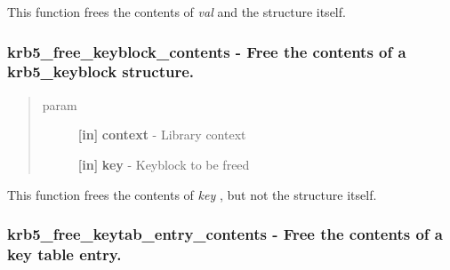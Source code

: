 \documentclass[letterpaper,10pt,english]{sphinxmanual}
\begin{document}
This function frees the contents of \emph{val} and the structure itself.


\subsubsection{krb5\_free\_keyblock\_contents -  Free the contents of a krb5\_keyblock structure.}
\label{appdev/refs/api/krb5_free_keyblock_contents::doc}\label{appdev/refs/api/krb5_free_keyblock_contents:krb5-free-keyblock-contents-free-the-contents-of-a-krb5-keyblock-structure}

\begin{fulllineitems}
\label{appdev/refs/api/krb5_free_keyblock_contents:krb5_free_keyblock_contents}
\end{fulllineitems}

\begin{quote}\begin{description}
\item[{param}] \leavevmode
\textbf{{[}in{]}} \textbf{context} - Library context

\textbf{{[}in{]}} \textbf{key} - Keyblock to be freed

\end{description}\end{quote}

This function frees the contents of \emph{key} , but not the structure itself.


\subsubsection{krb5\_free\_keytab\_entry\_contents -  Free the contents of a key table entry.}
\label{appdev/refs/api/krb5_free_keytab_entry_contents:krb5-free-keytab-entry-contents-free-the-contents-of-a-key-table-entry}\label{appdev/refs/api/krb5_free_keytab_entry_contents::doc}

\begin{fulllineitems}
\label{appdev/refs/api/krb5_free_keytab_entry_contents:krb5_free_keytab_entry_contents}
\end{fulllineitems}
\end{document}
